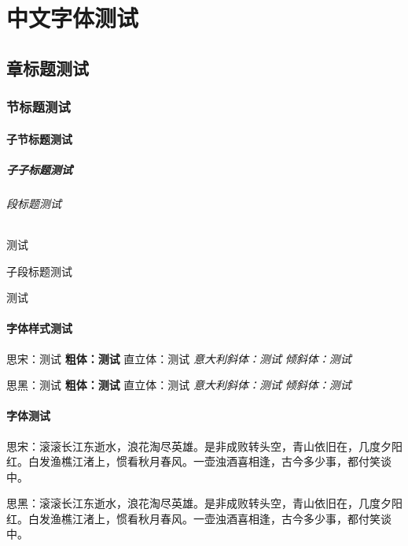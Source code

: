 \documentclass{resources/DocClass}
\begin{document}
    \maketitle
    \frontmatter
    
    
    {\centering \tableofcontents} %
    \mainmatter

    \part{中文字体测试}
    \chapter{章标题测试}
    \section{节标题测试}
    \subsection{子节标题测试}
    \subsubsection{子子标题测试}
    \paragraph{段标题测试}
    测试
    \subparagraph{子段标题测试}
    测试

    \subsection{字体样式测试}
    {\rmfamily 思宋：测试 \textbf{粗体：测试} \textup{直立体：测试} \textit{意大利斜体：测试} \textsl{倾斜体：测试}}

    {\sffamily 思黑：测试 \textbf{粗体：测试} \textup{直立体：测试} \textit{意大利斜体：测试} \textsl{倾斜体：测试}}

    \subsection{字体测试}
    {\rmfamily 思宋：滚滚长江东逝水，浪花淘尽英雄。是非成败转头空，青山依旧在，几度夕阳红。白发渔樵江渚上，惯看秋月春风。一壶浊酒喜相逢，古今多少事，都付笑谈中。}

    {\sffamily 思黑：滚滚长江东逝水，浪花淘尽英雄。是非成败转头空，青山依旧在，几度夕阳红。白发渔樵江渚上，惯看秋月春风。一壶浊酒喜相逢，古今多少事，都付笑谈中。}
\end{document}
